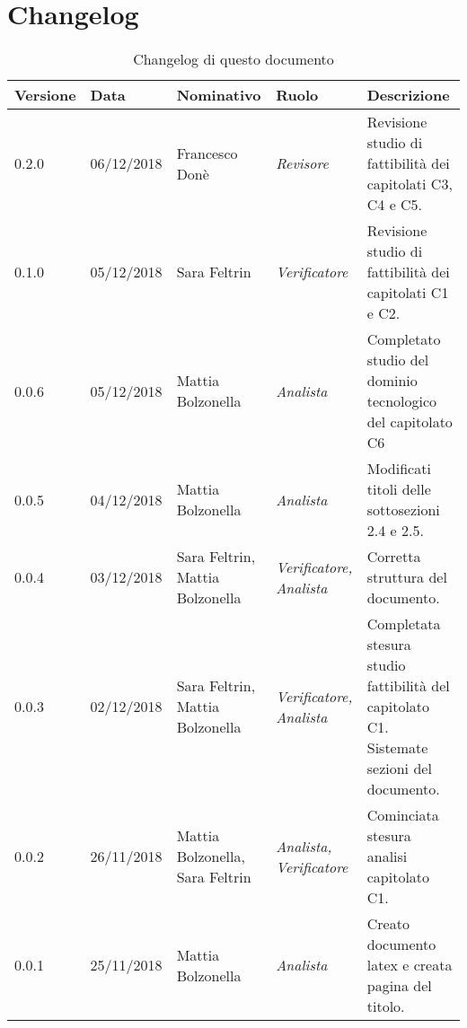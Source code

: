 \section{Changelog}
\begin{table}[tbph]
        \centering
        \begin{tabularx}{\textwidth}{|l|l|l|l|X|}
                \hline
                \textbf{Versione} & \textbf{Data} & \textbf{Nominativo}  & \textbf{Ruolo} & 
                \textbf{Descrizione}\\
                \hline \hline
              	0.2.0 & 06/12/2018 & Francesco Donè & \textit{Revisore} & 
              	Revisione studio di fattibilità dei capitolati C3, C4 e C5.\\
                
                \hline
                0.1.0 & 05/12/2018 & Sara Feltrin & \textit{Verificatore} & 
                Revisione studio di fattibilità dei capitolati C1 e C2.\\
              
                \hline
                0.0.6 & 05/12/2018 & Mattia Bolzonella & \textit{Analista} & 
                Completato studio del dominio tecnologico del capitolato C6\\
                
                \hline
                0.0.5 & 04/12/2018 & Mattia Bolzonella & \textit{Analista} & 
                Modificati titoli delle sottosezioni 2.4 e 2.5. \\
                
                \hline
                0.0.4 & 03/12/2018 & Sara Feltrin, Mattia Bolzonella 
                & \textit{Verificatore, Analista} & Corretta struttura del documento. \\
                
                \hline
                0.0.3 & 02/12/2018 & Sara Feltrin, Mattia Bolzonella & \textit{Verificatore, Analista}
                & Completata stesura studio fattibilità del capitolato C1.
                Sistemate sezioni del documento. \\
                
                \hline
                0.0.2 & 26/11/2018 & Mattia Bolzonella, Sara Feltrin & \textit{Analista, Verificatore}
                & Cominciata stesura analisi capitolato C1.\\

                \hline
                0.0.1 & 25/11/2018 & Mattia Bolzonella & \textit{Analista}
                & Creato documento latex e creata pagina del titolo.\\
                
                \hline
                
        \end{tabularx}
        \caption{Changelog di questo documento}
\end{table}